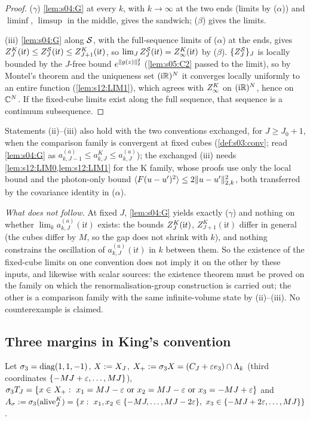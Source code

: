 \begin{proof}
($\gamma$) \cref{lem:s04:G} at every $k$, with $k\to\infty$ at the two ends (limits by ($\alpha$)) and $\liminf$, $\limsup$ in the middle, gives the sandwich; ($\beta$) gives the limits.

(iii) \cref{lem:s04:G} along $\mathcal S$, with the full-sequence limits of ($\alpha$) at the ends, gives $Z^{K}_{J}(\mathrm it)\le Z^{\mathcal S}_J(\mathrm it)\le Z^K_{J+1}(\mathrm it)$, so $\lim_JZ^{\mathcal S}_J(\mathrm it)=Z^{K}_{\infty}(\mathrm it)$ by ($\beta$). $\{Z^{\mathcal S}_J\}_J$ is locally bounded by the $J$-free bound $e^{\lVert g(z)\rVert_2^2}$ (\cref{lem:s05:C2} passed to the limit), so by Montel's theorem and the uniqueness set $(\mathrm i\mathbb R)^N$ it converges locally uniformly to an entire function (\cref{lem:s12:LIM1}), which agrees with $Z^{K}_{\infty}$ on $(\mathrm i\mathbb R)^N$, hence on $\mathbb C^N$. If the fixed-cube limits exist along the full sequence, that sequence is a continuum subsequence.
\end{proof}

Statements (ii)--(iii) also hold with the two conventions exchanged, for $J\ge J_0+1$, when the comparison family is convergent at fixed cubes (\cref{def:s03:conv}; read \cref{lem:s04:G} as $a^{(a)}_{k,J-1}\le a^K_{k,J}\le a^{(a)}_{k,J}$); the exchanged (iii) needs \cref{lem:s12:LIM0,lem:s12:LIM1} for the K family, whose proofs use only the local bound and the photon-only bound $\langle F(u-u')^2\rangle\le2\lVert u-u'\rVert_{2,k}^2$, both transferred by the covariance identity in ($\alpha$).

\emph{What does not follow.} At fixed $J$, \cref{lem:s04:G} yields exactly ($\gamma$) and nothing on whether $\lim_ka^{(a)}_{k,J}(\mathrm it)$ exists: the bounds $Z^{K}_{J}(\mathrm it)$, $Z^K_{J+1}(\mathrm it)$ differ in general (the cubes differ by $M$, so the gap does not shrink with $k$), and nothing constrains the oscillation of $a^{(a)}_{k,J}(\mathrm it)$ in $k$ between them. So the existence of the fixed-cube limits on one convention does not imply it on the other by these inputs, and likewise with scalar sources: the existence theorem must be proved on the family on which the renormalisation-group construction is carried out; the other is a comparison family with the same infinite-volume state by (ii)--(iii). No counterexample is claimed.

\subsection{Three margins in King's convention}

Let $\sigma_3=\operatorname{diag}(1,1,-1)$, $X:=X_J$, $X_+:=\sigma_3X=(C_J+\varepsilon e_3)\cap\Lambda_k$ (third coordinates $\{-MJ+\varepsilon,\dots,MJ\}$), $\sigma_3T_J=\{x\in X_+:\ x_1=MJ-\varepsilon\text{ or }x_2=MJ-\varepsilon\text{ or }x_3=-MJ+\varepsilon\}$ and $A_\sigma:=\sigma_3(\alive^K_J)=\{x:\ x_1,x_2\in\{-MJ,\dots,MJ-2\eps\},\ x_3\in\{-MJ+2\eps,\dots,MJ\}\}$.

